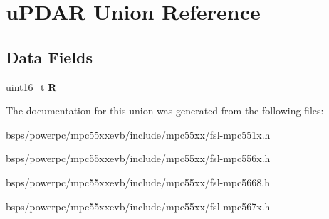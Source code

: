 \hypertarget{unionuPDAR}{}\section{u\+P\+D\+AR Union Reference}
\label{unionuPDAR}
\subsection*{Data Fields}
\begin{DoxyCompactItemize}
\item 
\mbox{\label{unionuPDAR_a478a226cc80fc57b8cdf8da94b6a779d}} 
uint16\+\_\+t {\bfseries R}
\end{DoxyCompactItemize}


The documentation for this union was generated from the following files\+:\begin{DoxyCompactItemize}
\item 
bsps/powerpc/mpc55xxevb/include/mpc55xx/fsl-\/mpc551x.\+h\item 
bsps/powerpc/mpc55xxevb/include/mpc55xx/fsl-\/mpc556x.\+h\item 
bsps/powerpc/mpc55xxevb/include/mpc55xx/fsl-\/mpc5668.\+h\item 
bsps/powerpc/mpc55xxevb/include/mpc55xx/fsl-\/mpc567x.\+h\end{DoxyCompactItemize}
